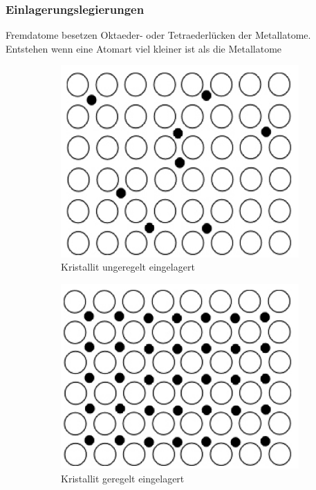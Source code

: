 \subsubsection{Einlagerungslegierungen}
Fremdatome besetzen Oktaeder- oder Tetraederlücken der Metallatome. Entstehen wenn eine Atomart viel kleiner ist als die Metallatome

\begin{figure}[htbp]
	\begin{subfigure}{0.32\linewidth}
		\centering
		\includegraphics[width=0.75\linewidth]{images/3_Ein_1.png}
		\caption{Kristallit ungeregelt eingelagert}
	\end{subfigure}
	\begin{subfigure}{0.32\linewidth}
		\centering
		\includegraphics[width=0.75\linewidth]{images/3_Ein_2.png}
		\caption{Kristallit geregelt eingelagert}
	\end{subfigure}
	\begin{subfigure}{0.32\linewidth}
		\centering

\end{subfigure}
\end{figure}

